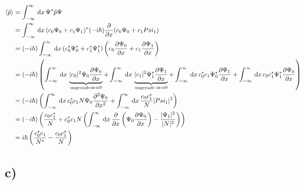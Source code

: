 \begin{align}
    \langle \hat p \rangle &= \int_{-\infty}^{\infty} \,\mathrm{d}x\, \Psi ^* \hat p \Psi \\
    &= \int_{-\infty}^{\infty} \,\mathrm{d}x\, (c_0 \Psi _0 + c_1 \Psi _1)^*(-i \hbar)\frac{\partial}{\partial x} (c_0 \Psi _0+c_1 Psi _1)\\
    &= (-i \hbar) \int_{-\infty}^{\infty} \,\mathrm{d}x\, (c_0^* \Psi _0^*+c_1^* \Psi _1^*)\left(c_0 \frac{\partial \Psi _0}{\partial x}+ c_1 \frac{\partial \Psi _1}{\partial x} \right)\\
    &= (-i\hbar) \left(\int_{-\infty}^{\infty} \,\mathrm{d}x\, \underbrace{\lvert c_0\rvert^2 \Psi _0 \frac{\partial \Psi _0}{\partial x}}_{\text{ungerade} \Rightarrow =0} +\int_{-\infty}^{\infty} \,\mathrm{d}x\, \underbrace{\lvert c_1\rvert^2 \Psi _1^* 
    \frac{\partial \Psi _1  }{\partial x}}_{\text{ungerade}\, \Rightarrow =0} + \int_{-\infty}^{\infty} \,\mathrm{d}x\, c_0^* c_1 \Psi _0^* \frac{\partial \Psi _1}{\partial x}+\int_{-\infty}^{\infty} \,\mathrm{d}x\, c_0 c_1^* \Psi _1^* \frac{\partial \Psi _0}{\partial x} \right)\\
    &=(-i \hbar) \left(\int_{-\infty}^{\infty} \,\mathrm{d}x\, c_0^* c_1 N \Psi _0 \frac{\partial ^2 \Psi _0}{\partial x^2} +\int_{-\infty}^{\infty} \,\mathrm{d}x\,\frac{c_0 c_1^*}{N} \lvert Psi _1\rvert^2 \right)\\
    &=(-i \hbar) \left(\frac{c_0 c_1^*}{N}+c_0^* c_1 N\left(\int_{-\infty}^{\infty} \,\mathrm{d}x\, \frac{\partial}{\partial x} \left(\Psi _0 \frac{\partial \Psi _0}{\partial x} \right)-\frac{\lvert\Psi _1\rvert^2}{\lvert N\rvert^2} \right)\right)\\
    &= i \hbar \left(\frac{c_0^*c_1}{N^*} -\frac{c_0c_1^*}{N} \right)
\end{align}

\subsection{c)}
 
